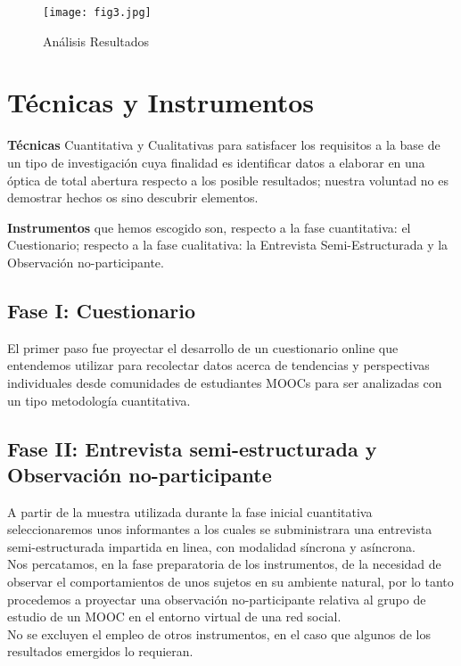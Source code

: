 \documentclass[11pt]{article}
\begin{document}
\begin{description}
\vspace{10pt}

\begin{figure}[ht]\centering
\texttt{[image: fig3.jpg]}
\caption{Análisis Resultados}
\label{fig:fig3.jpg}
\end{figure}

\section{Técnicas y Instrumentos}

\item \textbf{Técnicas} Cuantitativa y Cualitativas para satisfacer los requisitos a la base de un tipo de investigación cuya finalidad es identificar datos a elaborar en una óptica de total abertura respecto a los posible resultados; nuestra voluntad no es demostrar hechos os sino descubrir elementos.  

\item \textbf{Instrumentos} que hemos escogido son, respecto a la fase cuantitativa: el Cuestionario; respecto a la fase cualitativa: la Entrevista Semi-Estructurada y la Observación no-participante.

\subsection{Fase I: Cuestionario}
El primer paso fue proyectar el desarrollo de un cuestionario online que entendemos utilizar para recolectar datos acerca de tendencias y perspectivas individuales desde comunidades de estudiantes MOOCs para ser analizadas con un tipo metodología cuantitativa. 

\subsection{Fase II: Entrevista semi-estructurada y Observación no-participante}
A partir de la muestra utilizada durante la fase inicial cuantitativa seleccionaremos unos informantes a los cuales se subministrara una entrevista semi-estructurada impartida en linea, con modalidad síncrona y asíncrona.
\\Nos percatamos, en la fase preparatoria de los instrumentos, de la necesidad de observar el comportamientos de unos sujetos en su ambiente natural, por lo tanto procedemos a proyectar una observación no-participante relativa al grupo de estudio de un MOOC en el entorno virtual de una red social.
\\No se excluyen el empleo de otros instrumentos, en el caso que algunos de los resultados emergidos lo requieran. 


\end{description}
\end{document}

